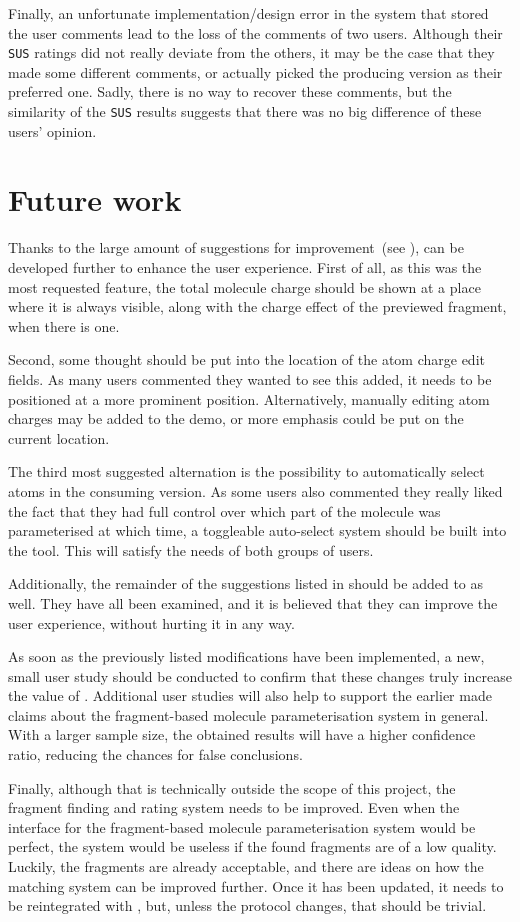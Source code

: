 Finally, an unfortunate implementation/design error in the system that stored the user comments lead to the loss of the comments of two users. Although their \verb|SUS| ratings did not really deviate from the others, it may be the case that they made some different comments, or actually picked the producing version as their preferred one. Sadly, there is no way to recover these comments, but the similarity of the \verb|SUS| results suggests that there was no big difference of these users' opinion.



\section{Future work}
Thanks to the large amount of suggestions for improvement~(see ), \oframp{} can be developed further to enhance the user experience. First of all, as this was the most requested feature, the total molecule charge should be shown at a place where it is always visible, along with the charge effect of the previewed fragment, when there is one.

Second, some thought should be put into the location of the atom charge edit fields. As many users commented they wanted to see this added, it needs to be positioned at a more prominent position. Alternatively, manually editing atom charges may be added to the demo, or more emphasis could be put on the current location.

The third most suggested alternation is the possibility to automatically select atoms in the consuming version. As some users also commented they really liked the fact that they had full control over which part of the molecule was parameterised at which time, a toggleable auto-select system should be built into the tool. This will satisfy the needs of both groups of users.

Additionally, the remainder of the suggestions listed in  should be added to \oframp{} as well. They have all been examined, and it is believed that they can improve the user experience, without hurting it in any way.

As soon as the previously listed modifications have been implemented, a new, small user study should be conducted to confirm that these changes truly increase the value of \oframp. Additional user studies will also help to support the earlier made claims about the fragment-based molecule parameterisation system in general. With a larger sample size, the obtained results will have a higher confidence ratio, reducing the chances for false conclusions.

Finally, although that is technically outside the scope of this project, the fragment finding and rating system needs to be improved. Even when the interface for the fragment-based molecule parameterisation system would be perfect, the system would be useless if the found fragments are of a low quality. Luckily, the fragments are already acceptable, and there are ideas on how the matching system can be improved further. Once it has been updated, it needs to be reintegrated with \oframp, but, unless the protocol changes, that should be trivial.
